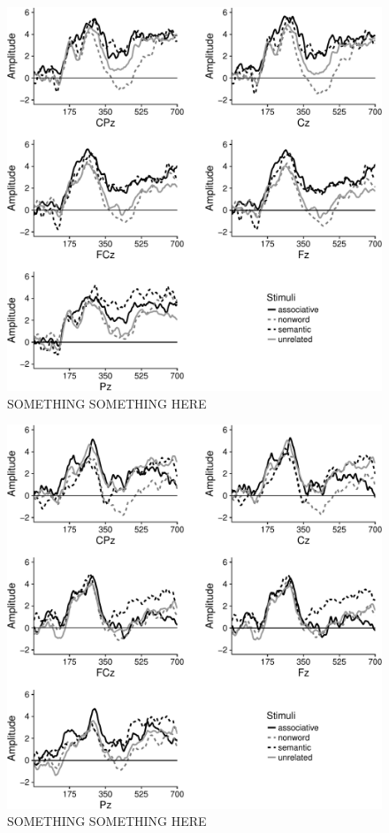 \documentclass[english,man]{apa6}
\theoremstyle{definition}
\theoremstyle{definition}
\theoremstyle{definition}
\theoremstyle{remark}
\begin{document}
\begin{figure}
\centering
\includegraphics{BrainPaper_files/figure-latex/graph-LDT-1.pdf}
\caption{\label{fig:graph-LDT}SOMETHING SOMETHING HERE}
\end{figure}

\begin{figure}
\centering
\includegraphics{BrainPaper_files/figure-latex/graph-LST-1.pdf}
\caption{\label{fig:graph-LST}SOMETHING SOMETHING HERE}
\end{figure}
\end{document}
